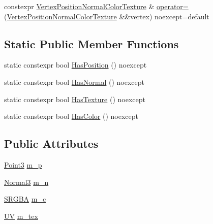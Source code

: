\begin{DoxyCompactItemize}
\item 
constexpr \hyperlink{structmage_1_1rendering_1_1_vertex_position_normal_color_texture}{Vertex\+Position\+Normal\+Color\+Texture} \& \hyperlink{structmage_1_1rendering_1_1_vertex_position_normal_color_texture_af737420814ca919b77b9b3593bd9a88b}{operator=} (\hyperlink{structmage_1_1rendering_1_1_vertex_position_normal_color_texture}{Vertex\+Position\+Normal\+Color\+Texture} \&\&vertex) noexcept=default
\end{DoxyCompactItemize}
\subsection*{Static Public Member Functions}
\begin{DoxyCompactItemize}
\item 
static constexpr bool \hyperlink{structmage_1_1rendering_1_1_vertex_position_normal_color_texture_a137dda2aa8e30d88c87b53cd4d2d2842}{Has\+Position} () noexcept
\item 
static constexpr bool \hyperlink{structmage_1_1rendering_1_1_vertex_position_normal_color_texture_aa8f1585c1dba229b765d5697a37cb0e6}{Has\+Normal} () noexcept
\item 
static constexpr bool \hyperlink{structmage_1_1rendering_1_1_vertex_position_normal_color_texture_a8b5e0a50a6119868ebf90247d321f172}{Has\+Texture} () noexcept
\item 
static constexpr bool \hyperlink{structmage_1_1rendering_1_1_vertex_position_normal_color_texture_a1688dd4509c6766bea6fc15a4bcb348d}{Has\+Color} () noexcept
\end{DoxyCompactItemize}
\subsection*{Public Attributes}
\begin{DoxyCompactItemize}
\item 
\hyperlink{structmage_1_1_point3}{Point3} \hyperlink{structmage_1_1rendering_1_1_vertex_position_normal_color_texture_a7eb2e2d7970bd3794d9b6f9f3b1db3e7}{m\+\_\+p}
\item 
\hyperlink{structmage_1_1_normal3}{Normal3} \hyperlink{structmage_1_1rendering_1_1_vertex_position_normal_color_texture_aa42ee4c320dec19edeef4a7018d68329}{m\+\_\+n}
\item 
\hyperlink{structmage_1_1_s_r_g_b_a}{S\+R\+G\+BA} \hyperlink{structmage_1_1rendering_1_1_vertex_position_normal_color_texture_aaa99420952a8a2a1ba557487ce448e17}{m\+\_\+c}
\item 
\hyperlink{structmage_1_1_u_v}{UV} \hyperlink{structmage_1_1rendering_1_1_vertex_position_normal_color_texture_a3c964b9b06e3bcc59b33fc1a273c13a7}{m\+\_\+tex}
\end{DoxyCompactItemize}
